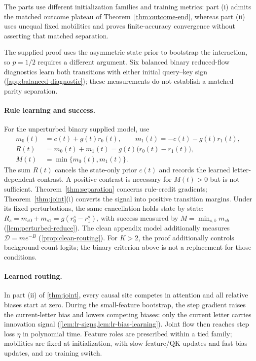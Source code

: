 The parts use different initialization families and training metrics:
part (i) admits the matched outcome plateau of Theorem~\ref{thm:outcome-end},
whereas part (ii) uses unequal fixed mobilities and proves finite-accuracy
convergence without asserting that matched separation.

The supplied proof uses the asymmetric state prior to bootstrap the interaction,
so $p=1/2$ requires a different argument. Six balanced binary reduced-flow diagnostics
learn both transitions with either initial query--key sign (\cref{app:balanced-diagnostic});
these measurements do not establish a matched parity separation.

\paragraph{Rule learning and success.}
For the unperturbed binary supplied model, use
\begin{equation}\label{eq:binary-rule-observables}
 \begin{aligned}
 m_0(t)&=c(t)+g(t)r_0(t),\qquad m_1(t)=-c(t)-g(t)r_1(t),\\
 R(t)&=m_0(t)+m_1(t)=g(t)\bigl(r_0(t)-r_1(t)\bigr),\\
 M(t)&=\min\{m_0(t),m_1(t)\}.
 \end{aligned}
\end{equation}
The sum $R(t)$ cancels the state-only prior $c(t)$ and records the learned
letter-dependent contrast. A positive contrast is necessary for $M(t)>0$
but is not sufficient. Theorem~\ref{thm:separation} concerns rule-credit gradients;
Theorem~\ref{thm:joint}(i) converts the signal into positive transition margins.
Under its fixed perturbations, the same cancellation holds state by state:
$R_s=m_{s0}+m_{s1}=g(r^s_0-r^s_1)$, with success measured by
$M=\min_{s,b}m_{sb}$ (\cref{lem:perturbed-reduce}).
The clean appendix model additionally measures $\mathcal D=me^{-B}$
(\cref{prop:clean-routing}).
For $K>2$, the proof additionally controls background-count logits;
the binary criterion above is not a replacement for those conditions.

\paragraph{Learned routing.}
In part (ii) of \cref{thm:joint}, every causal site competes in attention
and all relative biases start at zero. During the small-feature bootstrap, the step gradient raises
the current-letter bias and lowers competing biases: only the current letter carries innovation
signal (\cref{lem:lr-signs,lem:lr-bias-learning}). Joint flow then reaches step loss $\eta$ in
polynomial time. Feature roles are prescribed within a tied family; mobilities are fixed at
initialization, with slow feature/QK updates and fast bias updates, and no training switch.

